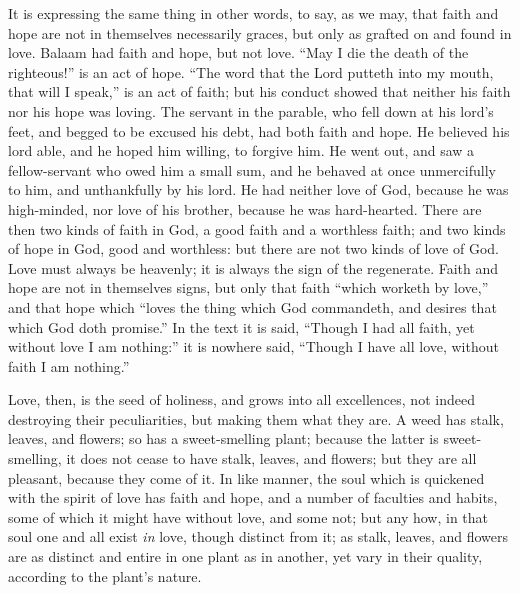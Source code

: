 It is expressing the same thing in other words, to say, as we may,
that faith and hope are not in themselves necessarily graces, but only
as grafted on and found in love. Balaam had faith and hope, but not
love. ``May I die the death of the righteous!'' is an act of
hope. ``The word that the Lord putteth into my mouth, that will I
speak,'' is an act of faith; but his conduct showed that neither
his faith nor his hope was loving. The servant in the parable, who
fell down at his lord's feet, and begged to be excused his debt, had
both faith and hope. He believed his lord able, and he hoped him
willing, to forgive him. He went out, and saw a fellow-servant who
owed him a small sum, and he behaved at once unmercifully to him, and
unthankfully by his lord. He had neither love of God, because he was
high-minded, nor love of his brother, because he was hard-hearted.
There are then two kinds of faith in God, a good faith and a worthless
faith; and two kinds of hope in God, good and worthless: but there are
not two kinds of love of God. Love must always be heavenly; it is
always the sign of the regenerate. Faith and hope are not in
themselves signs, but only that faith ``which worketh by
love,'' and that hope which ``loves the thing which God
commandeth, and desires that which God doth promise.'' In the text
it is said, ``Though I had all faith, yet without love I am nothing:'' it is nowhere said, ``Though I have all love,
without faith I am nothing.''

Love, then, is the seed of holiness, and grows into all
excellences, not indeed destroying their peculiarities, but making
them what they are. A weed has stalk, leaves, and flowers; so has a
sweet-smelling plant; because the latter is sweet-smelling, it does
not cease to have stalk, leaves, and flowers; but they are all
pleasant, because they come of it. In like manner, the soul which is
quickened with the spirit of love has faith and hope, and a number of
faculties and habits, some of which it might have without love, and
some not; but any how, in that soul one and all exist \emph{in} love,
though distinct from it; as stalk, leaves, and flowers are as distinct
and entire in one plant as in another, yet vary in their quality,
according to the plant's nature.

